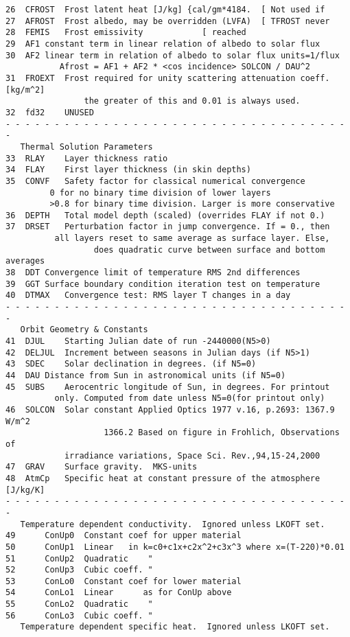 \begin{verbatim}
26	CFROST	Frost latent heat [J/kg] {cal/gm*4184. 	[ Not used if
27	AFROST	Frost albedo, may be overridden (LVFA)	[ TFROST never
28	FEMIS	Frost emissivity  			[ reached
29	AF1	constant term in linear relation of albedo to solar flux
30	AF2	linear term in relation of albedo to solar flux units=1/flux
		   Afrost = AF1 + AF2 * <cos incidence> SOLCON / DAU^2
31	FROEXT	Frost required for unity scattering attenuation coeff. [kg/m^2]
                the greater of this and 0.01 is always used.
32	fd32    UNUSED
- - - - - - - - - - - - - - - - - - - - - - - - - - - - - - - - - - - - 
   Thermal Solution Parameters
33	RLAY	Layer thickness ratio
34	FLAY	First layer thickness (in skin depths)
35	CONVF	Safety factor for classical numerical convergence
		 0 for no binary time division of lower layers
		 >0.8 for binary time division. Larger is more conservative
36	DEPTH	Total model depth (scaled) (overrides FLAY if not 0.)
37	DRSET   Perturbation factor in jump convergence. If = 0., then
		  all layers reset to same average as surface layer. Else,
                  does quadratic curve between surface and bottom averages
38	DDT	Convergence limit of temperature RMS 2nd differences
39	GGT	Surface boundary condition iteration test on temperature
40	DTMAX	Convergence test: RMS layer T changes in a day
- - - - - - - - - - - - - - - - - - - - - - - - - - - - - - - - - - - - 
   Orbit Geometry & Constants
41	DJUL	Starting Julian date of run -2440000(N5>0)
42	DELJUL	Increment between seasons in Julian days (if N5>1)
43	SDEC	Solar declination in degrees. (if N5=0)
44	DAU	Distance from Sun in astronomical units (if N5=0)
45	SUBS	Aerocentric longitude of Sun, in degrees. For printout 
		  only. Computed from date unless N5=0(for printout only)
46	SOLCON	Solar constant Applied Optics 1977 v.16, p.2693: 1367.9 W/m^2
                    1366.2 Based on figure in Frohlich, Observations of 
		    irradiance variations, Space Sci. Rev.,94,15-24,2000
47	GRAV	Surface gravity.  MKS-units
48	AtmCp   Specific heat at constant pressure of the atmosphere [J/kg/K]
- - - - - - - - - - - - - - - - - - - - - - - - - - - - - - - - - - - - 
   Temperature dependent conductivity.  Ignored unless LKOFT set.
49      ConUp0  Constant coef for upper material 
50      ConUp1  Linear   in k=c0+c1x+c2x^2+c3x^3 where x=(T-220)*0.01
51      ConUp2  Quadratic    " 
52      ConUp3  Cubic coeff. "
53      ConLo0  Constant coef for lower material 
54      ConLo1  Linear      as for ConUp above
55      ConLo2  Quadratic    "
56      ConLo3  Cubic coeff. "
   Temperature dependent specific heat.  Ignored unless LKOFT set.

\end{verbatim}
